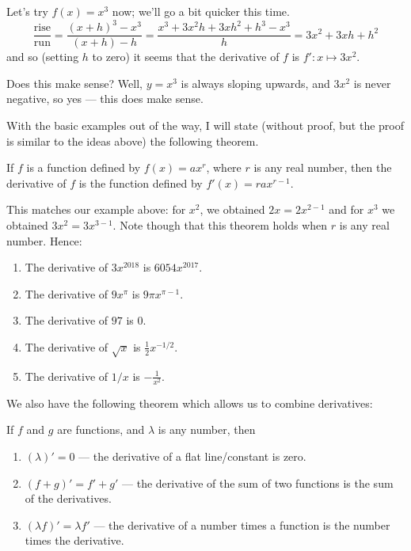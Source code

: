 \begin{ex}
  Let's try $ f(x) = x^3 $ now; we'll go a bit quicker this time.
  \begin{displaymath}
    \frac{\text{rise}}{\text{run}} = \frac{(x + h)^3 - x^3}{(x + h) - h} = \frac{x^3 + 3x^2h + 3xh^2 + h^3 - x^3}{h}
                                                                         = 3x^2 + 3xh + h^2
  \end{displaymath}
  and so (setting $ h $ to zero) it seems that the derivative of $ f $ is $ f' : x \mapsto 3x^2 $.

  Does this make sense? Well, $ y = x^3 $ is always sloping upwards, and $ 3x^2 $ is never negative, so yes --- this
  does make sense.
\end{ex}

With the basic examples out of the way, I will state (without proof, but the proof is similar to the ideas above) the following
theorem.
\begin{thm}
  If $ f $ is a function defined by $ f(x) = ax^r $, where $ r $ is any real number, then the derivative of $ f $ is the function
  defined by $ f'(x) = rax^{r - 1} $.
\end{thm}

This matches our example above: for $ x^2 $, we obtained $ 2x = 2x^{2 - 1} $ and for $ x^3 $ we obtained $ 3x^2 = 3x^{3 - 1} $. Note
though that this theorem holds when $ r $ is any real number. Hence:

\begin{ex}\leavevmode
  \begin{enumerate}
    \item The derivative of $ 3x^{2018} $ is $ 6054x^{2017} $.
    \item The derivative of $ 9x^\pi $ is $ 9\pi x^{\pi - 1} $.
    \item The derivative of $ 97 $ is $ 0 $.
    \item The derivative of $ \sqrt{x} $ is $ \frac{1}{2}x^{-1/2} $.
    \item The derivative of $ 1/x $ is $ -\frac{1}{x^2} $.
  \end{enumerate}
\end{ex}

\clearpage
We also have the following theorem which allows us to combine derivatives:

\begin{thm}
  If $ f $ and $ g $ are functions, and $ \lambda $ is any number, then
  \begin{enumerate}
    \item $ (\lambda)' = 0 $ --- the derivative of a flat line/constant is zero.
    \item $ (f + g)' = f' + g' $ --- the derivative of the sum of two functions is the sum of the derivatives.
    \item $ (\lambda f)' = \lambda f' $  --- the derivative of a number times a function is the number times the derivative.
  \end{enumerate}
\end{thm}

